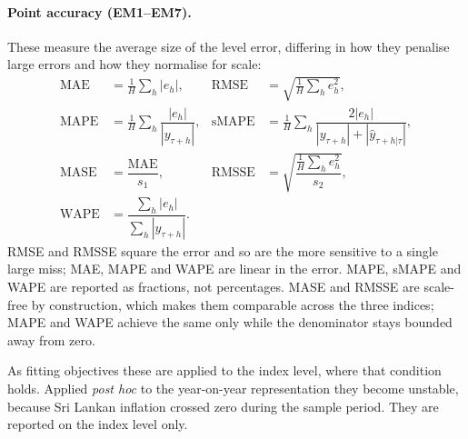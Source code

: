 \documentclass[12pt]{article}
\begin{document}
\paragraph{Point accuracy (EM1--EM7).}
These measure the average size of the level error, differing in how they
penalise large errors and how they normalise for scale:
\begin{align}
    \text{MAE}   &= \tfrac{1}{H}\textstyle\sum_{h} |e_h|, &
    \text{RMSE}  &= \sqrt{\tfrac{1}{H}\textstyle\sum_{h} e_h^2}, \\
    \text{MAPE}  &= \tfrac{1}{H}\textstyle\sum_{h} \dfrac{|e_h|}{|y_{\tau+h}|}, &
    \text{sMAPE} &= \tfrac{1}{H}\textstyle\sum_{h} \dfrac{2|e_h|}{|y_{\tau+h}| + |\hat{y}_{\tau+h|\tau}|}, \\
    \text{MASE}  &= \dfrac{\text{MAE}}{s_1}, &
    \text{RMSSE} &= \sqrt{\dfrac{\tfrac{1}{H}\sum_{h} e_h^2}{s_2}}, \\
    \text{WAPE}  &= \dfrac{\sum_{h} |e_h|}{\sum_{h} |y_{\tau+h}|} . & &
\end{align}
RMSE and RMSSE square the error and so are the more sensitive to a single large
miss; MAE, MAPE and WAPE are linear in the error. MAPE, sMAPE and WAPE are
reported as fractions, not percentages. MASE and RMSSE are scale-free by
construction, which makes them comparable across the three indices; MAPE and
WAPE achieve the same only while the denominator stays bounded away from zero.

As fitting objectives these are applied to the index level, where that condition
holds. Applied \emph{post hoc} to the year-on-year representation they become
unstable, because Sri Lankan inflation crossed zero during the sample period.
They are reported on the index level only.
\end{document}

